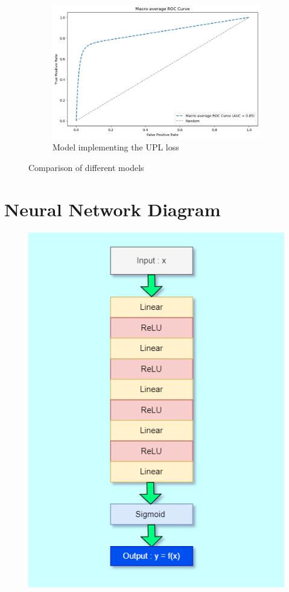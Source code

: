 \documentclass{article}
\begin{document}
\begin{figure}
    \vspace{10pt} %

    \begin{subfigure}{\textwidth}
        \centering
        \includegraphics[width=0.75\linewidth]{Model with UPL.png}
        \caption{Model implementing the UPL loss}
        \label{fig:Model implementing the UPL loss}
    \end{subfigure}

    \caption{Comparison of different models}
    \label{fig:models_comparison}
\end{figure}

\section{Neural Network Diagram}

\begin{figure}[H]
    \centering
    \includegraphics[width=0.6\linewidth]{Neural.png}
    \label{fig:enter-label}
\end{figure}
\end{document}
